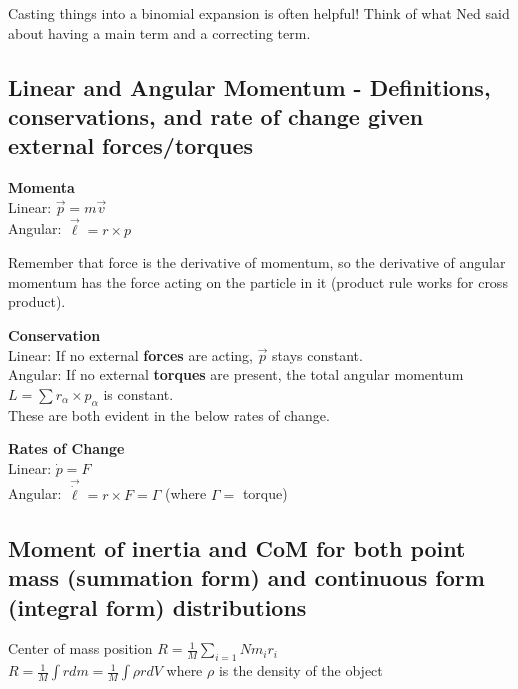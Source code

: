\documentclass[a4paper, 11pt]{article}
\begin{document}
  Casting things into a binomial expansion is often helpful! Think of what Ned
  said about having a main term and a correcting term.



  \subsection{Linear and Angular Momentum - Definitions, conservations, and rate of change
  given external forces/torques}

  \textbf{Momenta}\\
  Linear: $\vec{p} = m \vec{v}$\\
  Angular: $\vec{\ell} = r \times p$

  Remember that force is the derivative of momentum, so the derivative of angular
  momentum has the force acting on the particle in it (product rule works for
  cross product).

  \quad

  \textbf{Conservation}\\
  Linear: If no external \textbf{forces} are acting, $\vec{p}$ stays constant.\\
  Angular: If no external \textbf{torques} are present, the total angular
  momentum $ L = \sum r_\alpha \times p_\alpha$ is constant. \\
  These are both evident in the below rates of change.

  \quad

  \textbf{Rates of Change}\\
  Linear: $\dot{p} = F$ \\
  Angular: $\vec{\dot{\ell}} = r \times F = \Gamma$  (where $\Gamma = $ torque)


  \subsection{Moment of inertia and CoM for both point mass (summation form) and
  continuous form (integral form) distributions}

  Center of mass position $R = \frac{1}{M} \sum_{i=1}{N} m_i r_i$\\
  $R = \frac{1}{M} \int r dm = \frac{1}{M} \int \rho r dV$ where $\rho$ is the
  density of the object

  \quad
\end{document}
